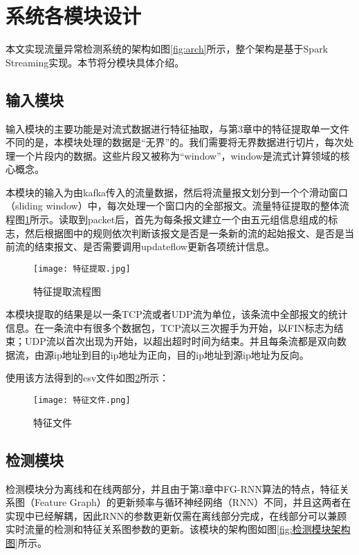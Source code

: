 \section{系统各模块设计}
本文实现流量异常检测系统的架构如图\ref{fig:arch}所示，整个架构是基于Spark Streaming实现。本节将分模块具体介绍。
\subsection{输入模块}
输入模块的主要功能是对流式数据进行特征抽取，与第3章中的特征提取单一文件不同的是，本模块处理的数据是“无界”的。我们需要将无界数据进行切片，每次处理一个片段内的数据。这些片段又被称为“window”，window是流式计算领域的核心概念。

本模块的输入为由kafka传入的流量数据，然后将流量报文划分到一个个滑动窗口（sliding window）中，每次处理一个窗口内的全部报文。流量特征提取的整体流程图\ref{fig:特征提取}所示。读取到packet后，首先为每条报文建立一个由五元组信息组成的标志，然后根据图中的规则依次判断该报文是否是一条新的流的起始报文、是否是当前流的结束报文、是否需要调用updateflow更新各项统计信息。

\begin{figure}
  \centering
  \texttt{[image: 特征提取.jpg]}
  \caption{特征提取流程图}
  \label{fig:特征提取}
\end{figure}

本模块提取的结果是以一条TCP流或者UDP流为单位，该条流中全部报文的统计信息。在一条流中有很多个数据包，TCP流以三次握手为开始，以FIN标志为结束；UDP流以首次出现为开始，以超出超时时间为结束。并且每条流都是双向数据流，由源ip地址到目的ip地址为正向，目的ip地址到源ip地址为反向。

使用该方法得到的csv文件如图\ref{fig:特征文件}所示：
\begin{figure}
    \centering
    \texttt{[image: 特征文件.png]}
    \caption{特征文件}
    \label{fig:特征文件}
  \end{figure}


\subsection{检测模块}
检测模块分为离线和在线两部分，并且由于第3章中FG-RNN算法的特点，特征关系图（Feature Graph）的更新频率与循环神经网络（RNN）不同，并且这两者在实现中已经解耦，因此RNN的参数更新仅需在离线部分完成，在线部分可以兼顾实时流量的检测和特征关系图参数的更新。该模块的架构图如图\ref{fig:检测模块架构图}所示。

